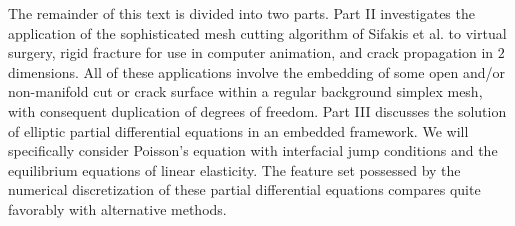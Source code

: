 The remainder of this text is divided into two parts. Part II investigates the application of the sophisticated mesh cutting algorithm of Sifakis et al. \cite{Sifakis07} to virtual surgery, rigid fracture for use in computer animation, and crack propagation in $2$ dimensions. All of these applications involve the embedding of some open and/or non-manifold cut or crack surface within a regular background simplex mesh, with consequent duplication of degrees of freedom. Part III discusses the solution of elliptic partial differential equations in an embedded framework. We will specifically consider Poisson's equation with interfacial jump conditions and the equilibrium equations of linear elasticity. The feature set possessed by the numerical discretization of these partial differential equations compares quite favorably with alternative methods.

